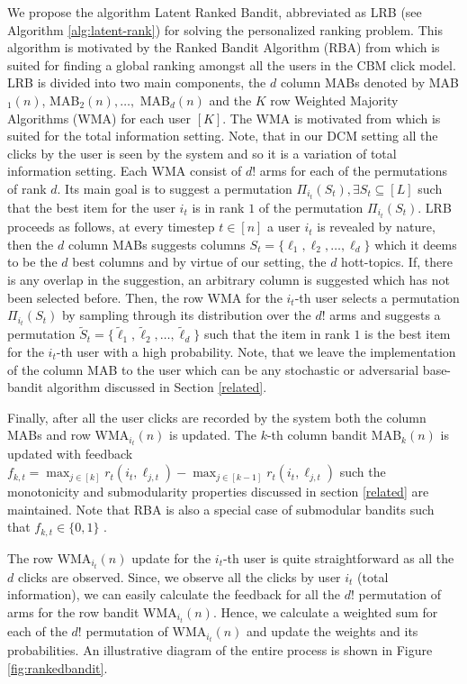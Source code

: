 We propose the algorithm Latent Ranked Bandit, abbreviated as LRB (see Algorithm \ref{alg:latent-rank}) for solving the personalized ranking problem. This algorithm is motivated by the Ranked Bandit Algorithm (RBA) from \citet{radlinski2008learning} which is suited for finding a global ranking amongst all the users in the CBM click model. LRB is divided into two main components, the $d$ column MABs denoted by MAB$_1(n)$, MAB$_2(n), \dots,$ MAB$_d(n)$ and the $K$ row Weighted Majority Algorithms (WMA) for each user $[K]$. The WMA is motivated from \citet{littlestone1994weighted} which is suited for the total information setting. Note, that in our DCM setting all the clicks by the user is seen by the system and so it is a variation of total information setting. Each WMA consist of $d!$ arms for each of the permutations of rank $d$. Its main goal is to suggest a permutation $\Pi_{i_t}(S_t), \exists S_t \subseteq [L]$ such that the best item for the user $i_t$ is in rank $1$ of the permutation $\Pi_{i_t}(S_t)$.  LRB proceeds as follows, at every timestep $t\in[n]$ a user $i_t$ is revealed by nature, then the $d$ column MABs suggests columns $S_t = \lbrace {\ell}_{1}, {\ell}_{2},\dots, {\ell}_{d} \rbrace$ which it deems to be the $d$ best columns and by virtue of our setting, the $d$ hott-topics. If, there is any overlap in the suggestion, an arbitrary column is suggested which has not been selected before. Then, the row WMA for the $i_t$-th user selects a permutation $\Pi_{i_t}(S_t)$ by sampling through its distribution over the $d!$ arms and suggests a permutation $\tilde{S}_t = \lbrace \tilde{\ell}_{1}, \tilde{\ell}_{2},\dots, \tilde{\ell}_{d}\rbrace$ such that the item in rank $1$ is the best item for the $i_t$-th user with a high probability. Note, that we leave the implementation of the column MAB to the user which can be any stochastic or adversarial base-bandit algorithm discussed in Section \ref{related}.

Finally, after all the user clicks are recorded by the system both the column MABs and row WMA$_{i_t}(n)$ is updated. The $k$-th column bandit MAB$_k(n)$ is updated with feedback $f_{k,t} = \max_{j\in [k]} r_t(i_t, \ell_{j,t}) - \max_{j\in [k-1]} r_t(i_t,\ell_{j,t})$ such the monotonicity and submodularity properties discussed in section \ref{related} are maintained. Note that RBA is also a special case of submodular bandits such that $f_{k,t}\in\lbrace 0, 1\rbrace$ \citep{streeter2009online}. 


The row WMA$_{i_t}(n)$ update for the $i_t$-th user is quite straightforward as all the $d$ clicks are observed. Since, we observe all the clicks by user $i_t$ (total information), we can easily calculate the feedback for all the $d!$ permutation of arms for the row bandit WMA$_{i_t}(n)$. Hence, we calculate a weighted sum for each of the $d!$ permutation of WMA$_{i_t}(n)$ and update the weights and its probabilities. An illustrative diagram of the entire process is shown in Figure \ref{fig:rankedbandit}.


